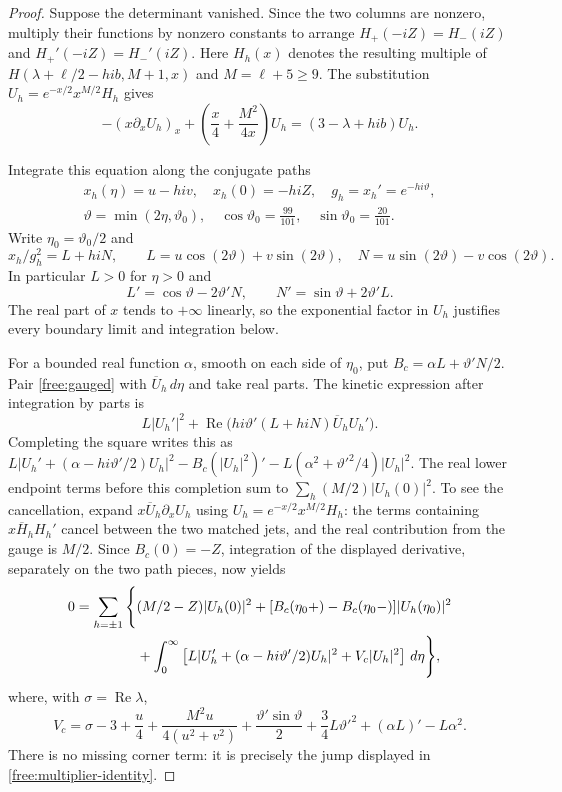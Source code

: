 \documentclass[11pt]{article}
\numberwithin{equation}{section}
\theoremstyle{definition}
\theoremstyle{remark}
\begin{document}
\begin{proof}
Suppose the determinant vanished.  Since the two columns are nonzero,
multiply their functions by nonzero constants to arrange
$H_+(-iZ)=H_-(iZ)$ and $H_+'(-iZ)=H_-'(iZ)$.
Here $H_h(x)$ denotes the resulting multiple of
$H(\lambda+\ell/2-hi b,M+1,x)$ and $M=\ell+5\ge9$.
The substitution $U_h=e^{-x/2}x^{M/2}H_h$ gives
\begin{equation}\label{free:gauged}
 -(x\partial_xU_h)_x+\left(\frac x4+\frac{M^2}{4x}\right)U_h
 =(3-\lambda+hi b)U_h.
\end{equation}

Integrate this equation along the conjugate paths
\[
 \begin{gathered}
 x_h(\eta)=u-hi v,\quad x_h(0)=-hiZ,\quad
 g_h=x_h'=e^{-hi\vartheta},\\
 \vartheta=\min(2\eta,\vartheta_0),\quad
 \cos\vartheta_0=\frac{99}{101},\quad
 \sin\vartheta_0=\frac{20}{101}.
 \end{gathered}
\]
Write $\eta_0=\vartheta_0/2$ and
\[
 x_h/g_h^2=L+hiN,\qquad
 L=u\cos(2\vartheta)+v\sin(2\vartheta),\quad
 N=u\sin(2\vartheta)-v\cos(2\vartheta).
\]
In particular $L>0$ for $\eta>0$ and
\[
 L'=\cos\vartheta-2\vartheta'N,\qquad
 N'=\sin\vartheta+2\vartheta'L.
\]
The real part of $x$ tends to $+\infty$ linearly, so the exponential
factor in $U_h$ justifies every boundary limit and integration below.

For a bounded real function $\alpha$, smooth on each side of $\eta_0$,
put $B_c=\alpha L+\vartheta'N/2$.  Pair
\eqref{free:gauged} with $\overline U_h\,d\eta$ and take real parts.
The kinetic expression after integration by parts is
\[
 L|U_h'|^2+\operatorname{Re}
 \big(hi\vartheta'(L+hiN)\overline U_hU_h'\big).
\]
Completing the square writes this as
$L|U_h'+(\alpha-hi\vartheta'/2)U_h|^2
-B_c(|U_h|^2)'-L(\alpha^2+\vartheta'^2/4)|U_h|^2$.
The real lower endpoint terms before this completion sum to
$\sum_h(M/2)|U_h(0)|^2$.  To see the cancellation, expand
$x\overline U_h\partial_xU_h$ using $U_h=e^{-x/2}x^{M/2}H_h$:
the terms containing $x\overline H_hH_h'$ cancel between the two
matched jets, and the real contribution from the gauge is $M/2$.
Since $B_c(0)=-Z$, integration of the displayed derivative, separately
on the two path pieces, now yields
\begin{align}\label{free:multiplier-identity}
 0=\sum_{h=\pm1}\Bigg\{&
 (M/2-Z)|U_h(0)|^2+
 [B_c(\eta_0+)-B_c(\eta_0-)]|U_h(\eta_0)|^2\notag\\
 &+\int_0^\infty
 \left[L|U_h'+(\alpha-hi\vartheta'/2)U_h|^2
       +V_c|U_h|^2\right]\,d\eta\Bigg\},
\end{align}
where, with $\sigma=\operatorname{Re}\lambda$,
\begin{equation}\label{free:multiplier-potential}
 V_c=\sigma-3+\frac u4+\frac{M^2u}{4(u^2+v^2)}
 +\frac{\vartheta'\sin\vartheta}{2}
 +\frac34L\vartheta'^2+(\alpha L)'-L\alpha^2.
\end{equation}
There is no missing corner term: it is precisely the jump displayed in
\eqref{free:multiplier-identity}.


\end{proof}
\end{document}
